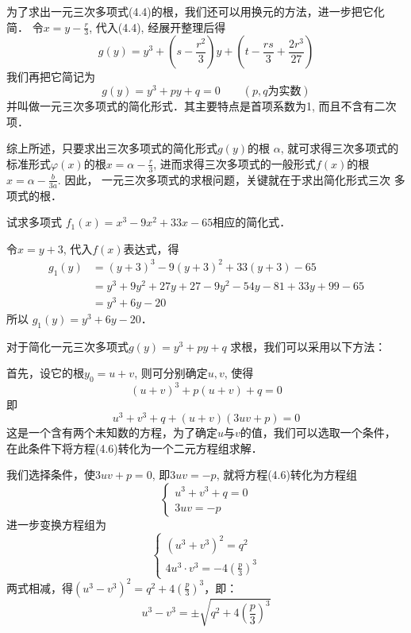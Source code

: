为了求出一元三次多项式(4.4)的根，我们还可以用换元的方法，进一步把它化简．
令$x=y-\frac{r}{3}$, 代入(4.4), 经展开整理后得
\[g(y) =y^3+ \left(s-\frac{r^2}{3}\right) y+ \left(t-\frac{rs}{3}+\frac{2r^3}{27}\right)\]
我们再把它简记为
\begin{equation}
    g(y)=y^3+py+q=0\qquad  (p,q\text{为实数})
\end{equation}
并叫做一元三次多项式的简化形式．其主要特点是首项系数为1, 而且不含有二次项．

综上所述，只要求出三次多项式的简化形式$g(y)$的根
$\alpha$, 就可求得三次多项式的标准形式$\varphi(x)$的根$x=\alpha-\frac{r}{3}$,
进而求得三次多项式的一般形式$f(x)$的根$x=\alpha-\frac{b}{3a}$. 因此，
一元三次多项式的求根问题，关键就在于求出简化形式三次
多项式的根．

\begin{example}
    试求多项式
$f_1 (x) =x^3-9x^2+33x-65$相应的简化式．
\end{example}


\begin{solution}
    令$x=y+3$, 代入$f(x)$表达式，得
\[\begin{split}
    g_1 (y) &= (y+3)^3-9 (y+3)^2+33 (y+3) -65\\
&=y^3+9y^2+27y+27-9y^2-54y-81+33y+99-65\\
&=y^3 +6y -20
\end{split}\]
所以
$g_1 (y) =y^3+6y-20$．
\end{solution}

对于简化一元三次多项式$g(y)=y^3+py+q$
求根，我们可以采用以下方法：

首先，设它的根$y_0=u+v$, 则可分别确定$u,v$, 使得
\begin{equation}
     (u+v)^3+p (u+v) +q=0
\end{equation}
即
\[u^3+v^3+q+ (u+v) (3uv+p)=0\]
这是一个含有两个未知数的方程，为了确定$u$与$v$的值，我们可以选取一个条件，在此条件下将方程(4.6)转化为一个二元方程组求解．

我们选择条件，使$3uv+p=0$, 即$3uv=-p$, 就将方程(4.6)转化为方程组
\[\begin{cases}
    u^3+v^3+q=0\\3uv=-p
\end{cases}\]
进一步变换方程组为
\[\begin{cases}
    (u^3+v^3)^2=q^2\\
    4u^3\cdot v^3=-4\left(\frac{p}{3}\right)^3
\end{cases}\]
两式相减，得$(u^3-v^3)^2=q^2+4\left(\frac{p}{3}\right)^3$，即：
\[u^3-v^3=\pm\sqrt{q^2+4\left(\frac{p}{3}\right)^3}\]


